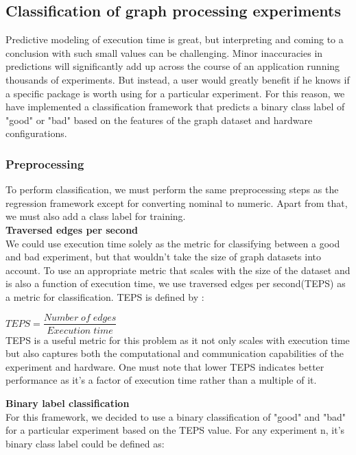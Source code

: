 
\subsection{Classification of graph processing experiments}

Predictive modeling of execution time is great, but interpreting and coming to a conclusion with such small values can be challenging. Minor inaccuracies in predictions will significantly add up across the course of an application running thousands of experiments. But instead, a user would greatly benefit if he knows if a specific package is worth using for a particular experiment. For this reason, we have implemented a classification framework that predicts a binary class label of "good" or "bad" based on the features of the graph dataset and hardware configurations.  

\subsubsection{Preprocessing}
To perform classification, we must perform the same preprocessing steps as the regression framework except for converting nominal to numeric. Apart from that, we must also add a class label for training. \\
\textbf{Traversed edges per second}\\
We could use execution time solely as the metric for classifying between a good and bad experiment, but that wouldn't take the size of graph datasets into account. To use an appropriate metric that scales with the size of the dataset and is also a function of execution time, we use traversed edges per second(TEPS) as a metric for classification. TEPS is defined by :


    $TEPS= \dfrac{Number\;of\; edges}{Execution\;time}$ \\


TEPS is a useful metric for this problem as it not only scales with execution time but also captures both the computational and communication capabilities of the experiment and hardware. One must note that lower TEPS indicates better performance as it's a factor of execution time rather than a multiple of it. 

\textbf{Binary label classification}\\
For this framework, we decided to use a binary classification of "good" and "bad" for a particular experiment based on the TEPS value. For any experiment n, it's binary class label could be defined as:


